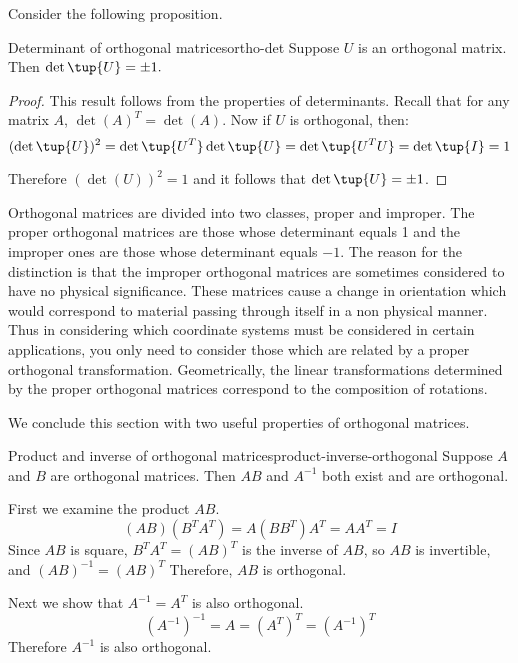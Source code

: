 Consider the following proposition.

\begin{proposition}{Determinant of orthogonal matrices}{ortho-det}
Suppose $U$ is an orthogonal matrix. Then $\det \tup{U} = \pm 1.$ 
\end{proposition}

\begin{proof}
This result follows from the properties of determinants. Recall that
for any matrix $A$, $\det(A)^T = \det(A)$. Now if $U$ is orthogonal, then:
\begin{equation*}
(\det \tup{U}) ^{2}=\det \tup{U^{T}} \det \tup{U}
=\det \tup{U^{T}U} =\det \tup{I} =1
\end{equation*}

Therefore $(\det (U))^2 = 1$ and it follows that $\det \tup{U} = \pm 1$. 
\end{proof}

Orthogonal matrices are divided into two classes, proper and improper.
The proper orthogonal matrices are those whose determinant equals 1
and the improper ones are those whose determinant equals $-1$. The
reason for the distinction is that the improper orthogonal matrices
are sometimes considered to have no physical significance. These
matrices cause a change in orientation which would correspond to
material passing through itself in a non physical manner. Thus in
considering which coordinate systems must be considered in certain
applications, you only need to consider those which are related by a
proper orthogonal transformation. Geometrically, the linear
transformations determined by the proper orthogonal matrices
correspond to the composition of rotations.

We conclude this section with two useful properties of orthogonal matrices. 

\begin{example}{Product and inverse of orthogonal matrices}{product-inverse-orthogonal}
Suppose $A$ and $B$ are orthogonal matrices. Then $AB$ and $A^{-1}$ both exist and are orthogonal.
\end{example}

\begin{solution}
First we examine the product $AB$. 
\[ (AB)(B^TA^T)=A(BB^T)A^T =AA^T=I \]
Since $AB$ is square, $B^TA^T=(AB)^T$ is the inverse of
$AB$, so $AB$ is invertible, and $(AB)^{-1}=(AB)^T$
Therefore, $AB$ is orthogonal.

Next we show that $A^{-1}=A^T$ is also orthogonal. 
\[ (A^{-1})^{-1} = A = (A^T)^{T}
=(A^{-1})^{T} \]
Therefore $A^{-1}$ is also orthogonal.
\end{solution}